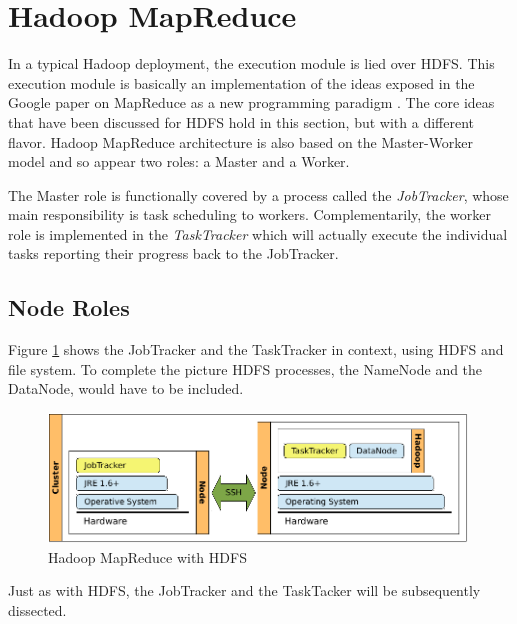 \section{Hadoop MapReduce}\label{sec:hadoopmapred}
\noindent In a typical Hadoop deployment, the execution module is lied over HDFS. This execution module is basically an implementation of the ideas exposed in the Google paper on MapReduce as a new programming paradigm \cite{googlemapreduce}. The core ideas that have been discussed for HDFS hold in this section, but with a different flavor. Hadoop MapReduce architecture is also based on the Master-Worker model and so appear two roles: a Master and a Worker.

The Master role is functionally covered by a process called the \emph{JobTracker}, whose main responsibility is task scheduling to workers. Complementarily, the worker role is implemented in the \emph{TaskTracker} which will actually execute the individual tasks reporting their progress back to the JobTracker.

\subsection{Node Roles}\label{subsec:rolesnodosmapred}
\noindent Figure \ref{fig:desplieguehadoopmapred} shows the JobTracker and the TaskTracker in context, using HDFS and file system. To complete the picture HDFS processes, the NameNode and the DataNode, would have to be included.

\begin{figure}[tbp]
\begin{center}
\includegraphics[width=0.99\textwidth]{imagenes/020.pdf}
 \caption{Hadoop MapReduce with HDFS}
\label{fig:desplieguehadoopmapred}
\end{center}
\end{figure}

Just as with HDFS, the JobTracker and the TaskTacker will be subsequently dissected.


